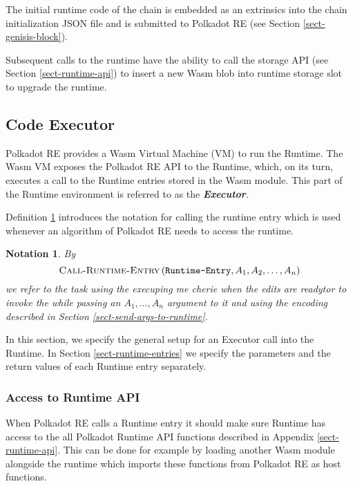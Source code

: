 \documentclass{article}
\newcommand{\tmem}[1]{{\em #1\/}}
\newcommand{\tmname}[1]{\textsc{#1}}
\newcommand{\tmstrong}[1]{\textbf{#1}}
\newcommand{\tmtextbf}[1]{{\bfseries{#1}}}
\newcommand{\tmtextit}[1]{{\itshape{#1}}}
\newcommand{\tmtextsc}[1]{{\scshape{#1}}}
\newcommand{\tmtexttt}[1]{{\ttfamily{#1}}}
\newcommand{\tmverbatim}[1]{{\ttfamily{#1}}}
\newtheorem{notation}{Notation}
\providecommand{\tmem}[1]{\tmtextit{#1}}
\providecommand{\tmname}[1]{\tmtextsc{#1}}
\providecommand{\tmstrong}[1]{\tmtextbf{#1}}
\providecommand{\tmtextbf}[1]{\tmtextbf{#1}}
\providecommand{\tmtextit}[1]{\tmtextit{#1}}
\providecommand{\tmverbatim}[1]{\tmtexttt{#1}}
\newtheorem{notation}{Notation}
\begin{document}
The initial runtime code of the chain is embedded as an extrinsics into the
chain initialization JSON file and is submitted to Polkadot RE (see Section
\ref{sect-genisis-block}).

Subsequent calls to the runtime have the ability to call the storage API (see
Section \ref{sect-runtime-api}) to insert a new Wasm blob into runtime storage
slot to upgrade the runtime.

\subsection{Code Executor}

Polkadot RE provides a Wasm Virtual Machine (VM) to run the Runtime. The Wasm
VM exposes the Polkadot RE API to the Runtime, which, on its turn, executes a
call to the Runtime entries stored in the Wasm module. This part of the
Runtime environment is referred to as the {\tmem{{\tmstrong{Executor}}.}}

Definition \ref{nota-call-into-runtime} introduces the notation for calling
the runtime entry which is used whenever an algorithm of Polkadot RE needs to
access the runtime.

\begin{notation}
  \label{nota-call-into-runtime} By
  \[ \text{{\tmname{Call-Runtime-Entry}}} \left(
     \text{\tmverbatim{Runtime-Entry}}, A_1, A_2, \ldots, A_n \right) \]
  we refer to the task using the execuping me cherie when the edits are
  readytor to invoke the \tmverbatim{Runtime-Entry} while passing an $A_1,
  \ldots, A_n$ argument to it and using the encoding described in Section
  \ref{sect-send-args-to-runtime}.
\end{notation}

In this section, we specify the general setup for an Executor call into the
Runtime. In Section \ref{sect-runtime-entries} we specify the parameters and
the return values of each Runtime entry separately.

\subsubsection{Access to Runtime API}

When Polkadot RE calls a Runtime entry it should make sure Runtime has access
to the all Polkadot Runtime API functions described in Appendix
\ref{sect-runtime-api}. This can be done for example by loading another Wasm
module alongside the runtime which imports these functions from Polkadot RE as
host functions.
\end{document}
